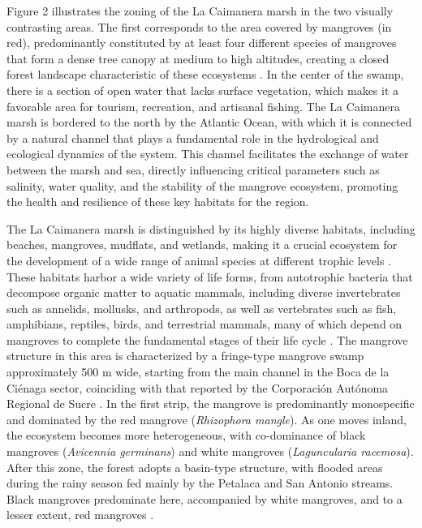 \documentclass[10pt,a4paper,twocolumn]{article}
\begin{document}
Figure 2 illustrates the zoning of the La Caimanera marsh in the two visually contrasting areas. The first corresponds to the area covered by mangroves (in red), predominantly constituted by at least four different species of mangroves that form a dense tree canopy at medium to high altitudes, creating a closed forest landscape characteristic of these ecosystems \cite{quiroz2023cambios}. In the center of the swamp, there is a section of open water that lacks surface vegetation, which makes it a favorable area for tourism, recreation, and artisanal fishing. The La Caimanera marsh is bordered to the north by the Atlantic Ocean, with which it is connected by a natural channel that plays a fundamental role in the hydrological and ecological dynamics of the system. This channel facilitates the exchange of water between the marsh and sea, directly influencing critical parameters such as salinity, water quality, and the stability of the mangrove ecosystem, promoting the health and resilience of these key habitats for the region.

The La Caimanera marsh is distinguished by its highly diverse habitats, including beaches, mangroves, mudflats, and wetlands, making it a crucial ecosystem for the development of a wide range of animal species at different trophic levels \cite{bernal2017assessment}. These habitats harbor a wide variety of life forms, from autotrophic bacteria that decompose organic matter to aquatic mammals, including diverse invertebrates such as annelids, mollusks, and arthropods, as well as vertebrates such as fish, amphibians, reptiles, birds, and terrestrial mammals, many of which depend on mangroves to complete the fundamental stages of their life cycle \cite{urueta2010cienaga}. The mangrove structure in this area is characterized by a fringe-type mangrove swamp approximately 500 m wide, starting from the main channel in the Boca de la Ciénaga sector, coinciding with that reported by the Corporación Autónoma Regional de Sucre \cite{carsucre2023pai}. In the first strip, the mangrove is predominantly monospecific and dominated by the red mangrove (\textit{Rhizophora mangle}). As one moves inland, the ecosystem becomes more heterogeneous, with co-dominance of black mangroves (\textit{Avicennia germinans}) and white mangroves (\textit{Laguncularia racemosa}). After this zone, the forest adopts a basin-type structure, with flooded areas during the rainy season fed mainly by the Petalaca and San Antonio streams. Black mangroves predominate here, accompanied by white mangroves, and to a lesser extent, red mangroves \cite{quintero2022variabilidad}.
\end{document}
